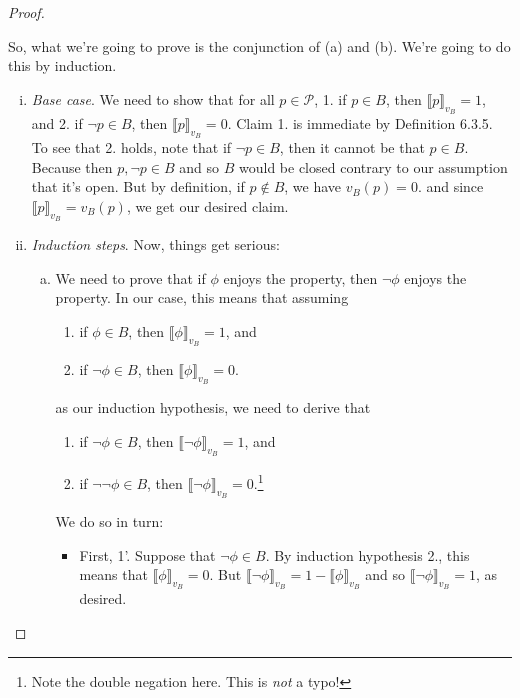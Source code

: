\begin{enumerate}[\thesection.1]
\begin{proof}
\begin{enumerate}[1.]
	\end{enumerate}
	So, what we're going to prove is the conjunction of (a) and (b). We're going to do this by induction.
	
	\begin{enumerate}[(i)]
	
		\item \emph{Base case}. We need to show that for all $p\in \mathcal{P}$, 1. if $p\in B$, then $\llbracket p\rrbracket_{v_B}=1$, and 2. if $\neg p\in B$, then $\llbracket p\rrbracket_{v_B}=0$. Claim 1. is immediate by Definition 6.3.5. To see that 2. holds, note that if $\neg p\in B$, then it cannot be that $p\in B$. Because then $p,\neg p\in B$ and so $B$ would be closed contrary to our assumption that it's open. But by definition, if $p\notin B$, we have $v_B(p)=0$. and since $\llbracket p\rrbracket_{v_B}=v_B(p)$, we get our desired claim.
		
		\item \emph{Induction steps}. Now, things get serious:
		
		\begin{enumerate}[(a)]
		
			\item We need to prove that if $\phi$ enjoys the property, then $\neg \phi$ enjoys the property. In our case, this means that assuming
		\begin{enumerate}[1.]
	
		\item if $\phi\in B$, then $\llbracket\phi\rrbracket_{v_B}=1$, and 
		\item if $\neg \phi\in B$, then $\llbracket\phi\rrbracket_{v_B}=0$.
	
	\end{enumerate}
	as our induction hypothesis, we need to derive that 
		\begin{enumerate}[1'.]
	
		\item if $\neg\phi\in B$, then $\llbracket\neg\phi\rrbracket_{v_B}=1$, and 
		\item if $\neg\neg \phi\in B$, then $\llbracket\neg\phi\rrbracket_{v_B}=0$.\footnote{Note the double negation here. This is \emph{not} a typo!}
	
	\end{enumerate}
	We do so in turn:
	
	\begin{itemize}
	
		\item First, 1'. Suppose that $\neg \phi\in B$. By induction hypothesis 2., this means that $\llbracket\phi\rrbracket_{v_B}=0$. But $\llbracket\neg\phi\rrbracket_{v_B}=1-\llbracket\phi\rrbracket_{v_B}$ and so $\llbracket\neg\phi\rrbracket_{v_B}=1$, as desired.
	

\end{itemize}
\end{enumerate}
\end{enumerate}
\end{proof}
\end{enumerate}
